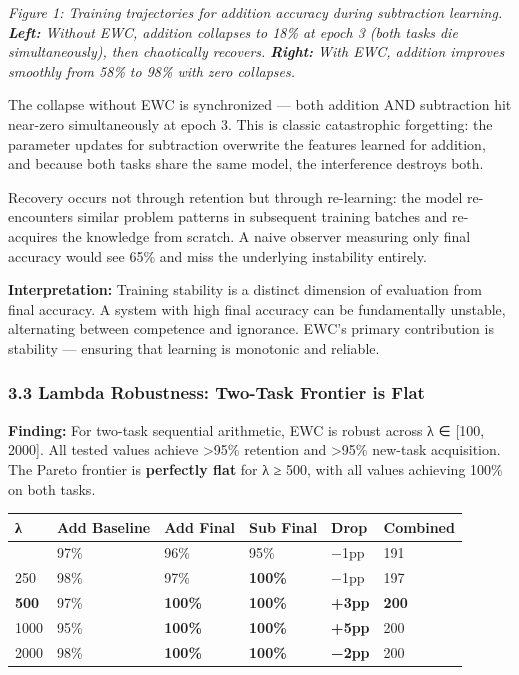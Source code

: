 \documentclass[
]{article}
\begin{document}
\emph{Figure 1: Training trajectories for addition accuracy during
subtraction learning. \textbf{Left:} Without EWC, addition collapses to
18\% at epoch 3 (both tasks die simultaneously), then chaotically
recovers. \textbf{Right:} With EWC, addition improves smoothly from 58\%
to 98\% with zero collapses.}

The collapse without EWC is synchronized --- both addition AND
subtraction hit near-zero simultaneously at epoch 3. This is classic
catastrophic forgetting: the parameter updates for subtraction overwrite
the features learned for addition, and because both tasks share the same
model, the interference destroys both.

Recovery occurs not through retention but through re-learning: the model
re-encounters similar problem patterns in subsequent training batches
and re-acquires the knowledge from scratch. A naive observer measuring
only final accuracy would see 65\% and miss the underlying instability
entirely.

\textbf{Interpretation:} Training stability is a distinct dimension of
evaluation from final accuracy. A system with high final accuracy can be
fundamentally unstable, alternating between competence and ignorance.
EWC's primary contribution is stability --- ensuring that learning is
monotonic and reliable.

\subsubsection{3.3 Lambda Robustness: Two-Task Frontier is
Flat}\label{lambda-robustness-two-task-frontier-is-flat}

\textbf{Finding:} For two-task sequential arithmetic, EWC is robust
across λ ∈ {[}100, 2000{]}. All tested values achieve \textgreater95\%
retention and \textgreater95\% new-task acquisition. The Pareto frontier
is \textbf{perfectly flat} for λ ≥ 500, with all values achieving 100\%
on both tasks.

\begin{longtable}[]{@{}llllll@{}}
\toprule\noalign{}
λ & Add Baseline & Add Final & Sub Final & Drop & Combined \\
\midrule\noalign{}
\endhead
\bottomrule\noalign{}
\endlastfoot
100 & 97\% & 96\% & 95\% & −1pp & 191 \\
250 & 98\% & 97\% & \textbf{100\%} & −1pp & 197 \\
\textbf{500} & 97\% & \textbf{100\%} & \textbf{100\%} & \textbf{+3pp} &
\textbf{200} \\
1000 & 95\% & \textbf{100\%} & \textbf{100\%} & \textbf{+5pp} & 200 \\
2000 & 98\% & \textbf{100\%} & \textbf{100\%} & \textbf{−2pp} & 200 \\
\end{longtable}
\end{document}
